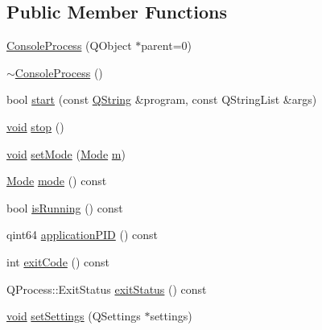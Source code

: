 \subsection*{\-Public \-Member \-Functions}
\begin{DoxyCompactItemize}
\item 
\hyperlink{class_utils_1_1_console_process_af12bb9d4a8da527e9af245c4bac14e01}{\-Console\-Process} (\-Q\-Object $\ast$parent=0)
\item 
\hyperlink{class_utils_1_1_console_process_aa05892f0066ec865160ea3a4944151c7}{$\sim$\-Console\-Process} ()
\item 
bool \hyperlink{class_utils_1_1_console_process_a882d1caae03faaa2b9e2ad7edab2d68a}{start} (const \hyperlink{group___u_a_v_objects_plugin_gab9d252f49c333c94a72f97ce3105a32d}{\-Q\-String} \&program, const \-Q\-String\-List \&args)
\item 
\hyperlink{group___u_a_v_objects_plugin_ga444cf2ff3f0ecbe028adce838d373f5c}{void} \hyperlink{class_utils_1_1_console_process_a15dd3ed04029a5899bdbc84e64a9bb09}{stop} ()
\item 
\hyperlink{group___u_a_v_objects_plugin_ga444cf2ff3f0ecbe028adce838d373f5c}{void} \hyperlink{class_utils_1_1_console_process_af221c5c6a26a6286ae5a0bbfcf094b1b}{set\-Mode} (\hyperlink{class_utils_1_1_console_process_a6c86a313e133158cd77772a207426e41}{\-Mode} \hyperlink{uavobjecttemplate_8m_ab3cd915d758008bd19d0f2428fbb354a}{m})
\item 
\hyperlink{class_utils_1_1_console_process_a6c86a313e133158cd77772a207426e41}{\-Mode} \hyperlink{class_utils_1_1_console_process_a697ed590a6d3fad5eca1258b7e9fd56b}{mode} () const 
\item 
bool \hyperlink{class_utils_1_1_console_process_ab3a478c30db598118ce83987d79c0cac}{is\-Running} () const 
\item 
qint64 \hyperlink{class_utils_1_1_console_process_a8b7e361cd1605e2127ca63d1d9fa6118}{application\-P\-I\-D} () const 
\item 
int \hyperlink{class_utils_1_1_console_process_abce142102a6c34221a78b1909edbdfa1}{exit\-Code} () const 
\item 
\-Q\-Process\-::\-Exit\-Status \hyperlink{class_utils_1_1_console_process_a6f7c21885bbae03bc2f4e315a31f8cce}{exit\-Status} () const 
\item 
\hyperlink{group___u_a_v_objects_plugin_ga444cf2ff3f0ecbe028adce838d373f5c}{void} \hyperlink{class_utils_1_1_console_process_a6450617efe1483c142de24f60fabc523}{set\-Settings} (\-Q\-Settings $\ast$settings)
\end{DoxyCompactItemize}
